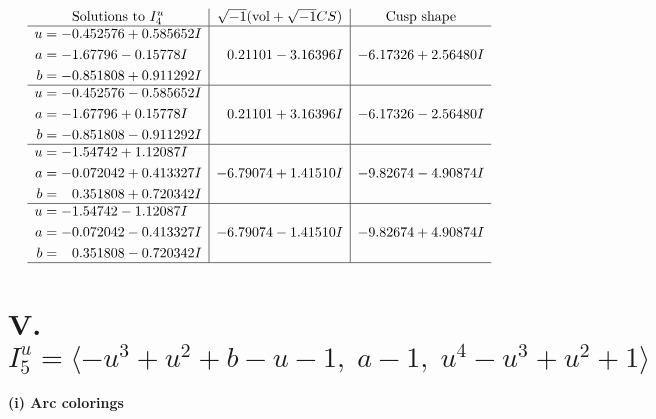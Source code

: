 \documentclass[1p]{elsarticle_modified}
\theoremstyle{definition}
\newcommand{\I}{\sqrt{-1}}
\begin{document}
$$\begin{array}{c|c|c}  
\text{Solutions to }I^u_{4}& \I (\text{vol} + \sqrt{-1}CS) & \text{Cusp shape}\\
 \hline 
\begin{aligned}
u &= -0.452576 + 0.585652 I \\
a &= -1.67796 - 0.15778 I \\
b &= -0.851808 + 0.911292 I\end{aligned}
 & \phantom{-}0.21101 - 3.16396 I & -6.17326 + 2.56480 I \\ \hline\begin{aligned}
u &= -0.452576 - 0.585652 I \\
a &= -1.67796 + 0.15778 I \\
b &= -0.851808 - 0.911292 I\end{aligned}
 & \phantom{-}0.21101 + 3.16396 I & -6.17326 - 2.56480 I \\ \hline\begin{aligned}
u &= -1.54742 + 1.12087 I \\
a &= -0.072042 + 0.413327 I \\
b &= \phantom{-}0.351808 + 0.720342 I\end{aligned}
 & -6.79074 + 1.41510 I & -9.82674 - 4.90874 I \\ \hline\begin{aligned}
u &= -1.54742 - 1.12087 I \\
a &= -0.072042 - 0.413327 I \\
b &= \phantom{-}0.351808 - 0.720342 I\end{aligned}
 & -6.79074 - 1.41510 I & -9.82674 + 4.90874 I\\
 \hline 
 \end{array}$$\newpage\newpage\renewcommand{\arraystretch}{1}
\centering \section*{V. $I^u_{5}= \langle - u^3+u^2+b- u-1,\;a-1,\;u^4- u^3+u^2+1 \rangle$}
\flushleft \textbf{(i) Arc colorings}\\
\end{document}
